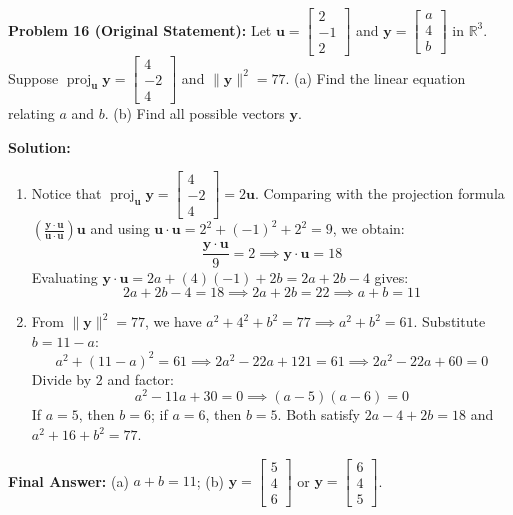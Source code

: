 \documentclass[11pt, letterpaper]{article}
\theoremstyle{definition}
\theoremstyle{remark}
\begin{document}
\medskip
\textbf{Problem 16 (Original Statement):} Let $\mathbf{u} = \begin{bmatrix} 2 \\ -1 \\ 2 \end{bmatrix}$ and $\mathbf{y} = \begin{bmatrix} a \\ 4 \\ b \end{bmatrix}$ in $\mathbb{R}^3$. Suppose $\operatorname{proj}_{\mathbf{u}}\mathbf{y} = \begin{bmatrix} 4 \\ -2 \\ 4 \end{bmatrix}$ and $\|\mathbf{y}\|^2 = 77$. (a) Find the linear equation relating $a$ and $b$. (b) Find all possible vectors $\mathbf{y}$.

\textbf{Solution:}
\begin{enumerate}[label=(\alph*)]
    \item Notice that $\operatorname{proj}_{\mathbf{u}}\mathbf{y} = \begin{bmatrix} 4 \\ -2 \\ 4 \end{bmatrix} = 2\mathbf{u}$. Comparing with the projection formula $\left(\frac{\mathbf{y} \cdot \mathbf{u}}{\mathbf{u} \cdot \mathbf{u}}\right)\mathbf{u}$ and using $\mathbf{u} \cdot \mathbf{u} = 2^2 + (-1)^2 + 2^2 = 9$, we obtain:
    \[
    \frac{\mathbf{y} \cdot \mathbf{u}}{9} = 2 \implies \mathbf{y} \cdot \mathbf{u} = 18
    \]
    Evaluating $\mathbf{y} \cdot \mathbf{u} = 2a + (4)(-1) + 2b = 2a + 2b - 4$ gives:
    \[
    2a + 2b - 4 = 18 \implies 2a + 2b = 22 \implies a + b = 11
    \]
    \item From $\|\mathbf{y}\|^2 = 77$, we have $a^2 + 4^2 + b^2 = 77 \implies a^2 + b^2 = 61$. Substitute $b = 11 - a$:
    \[
    a^2 + (11 - a)^2 = 61 \implies 2a^2 - 22a + 121 = 61 \implies 2a^2 - 22a + 60 = 0
    \]
    Divide by $2$ and factor:
    \[
    a^2 - 11a + 30 = 0 \implies (a - 5)(a - 6) = 0
    \]
    If $a = 5$, then $b = 6$; if $a = 6$, then $b = 5$. Both satisfy $2a - 4 + 2b = 18$ and $a^2 + 16 + b^2 = 77$.
\end{enumerate}
\textbf{Final Answer:} (a) $a + b = 11$; (b) $\mathbf{y} = \begin{bmatrix} 5 \\ 4 \\ 6 \end{bmatrix}$ or $\mathbf{y} = \begin{bmatrix} 6 \\ 4 \\ 5 \end{bmatrix}$.
\end{document}
